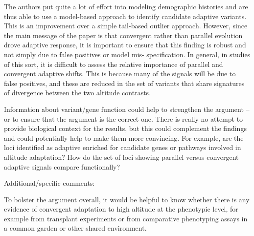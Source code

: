 \documentclass[onecolumn,oneside,letterpaper]{article}
\begin{document}
The authors put quite a lot of effort into modeling demographic histories and are thus able to use a model-based approach to identify candidate adaptive variants.  This is an improvement over a simple tail-based outlier approach.  However, since the main message of the paper is that convergent rather than parallel evolution drove adaptive response, it is important to ensure that this finding is robust and not simply due to false positives or model mis- specification.  In general, in studies of this sort, it is difficult to assess the relative importance of parallel and convergent adaptive shifts. This is because many of the signals will be due to false positives, and these are reduced in the set of variants that share signatures of divergence between the two altitude contrasts.  

Information about variant/gene function could help to strengthen the argument -- or to ensure that the argument is the correct one.  There is really no attempt to provide biological context for the results, but this could complement the findings and could potentially help to make them more convincing.  For example, are the loci identified as adaptive enriched for candidate genes or pathways involved in altitude adaptation? How do the set of loci showing parallel versus convergent adaptive signals compare functionally?   

Additional/specific comments:  

To bolster the argument overall, it would be helpful to know whether there is any evidence of convergent adaptation to high altitude at the phenotypic level, for example from transplant experiments or from comparative phenotyping assays in a common garden or other shared environment.  
\end{document}

